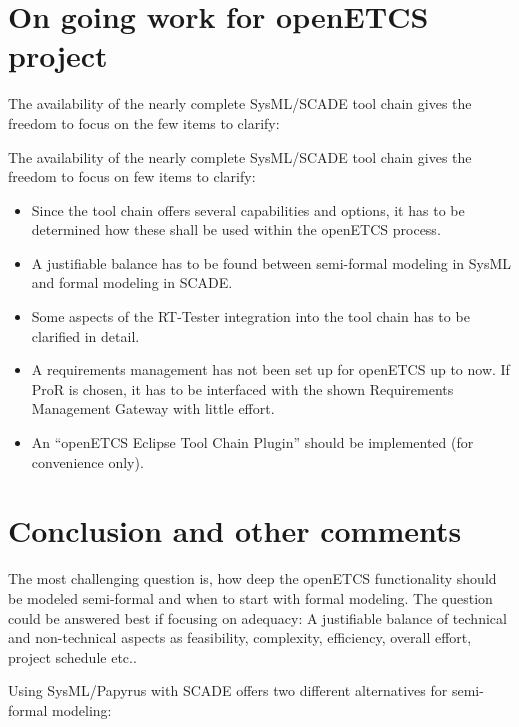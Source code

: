 \section{On going work for openETCS project}

The availability of the nearly complete SysML/SCADE tool chain gives the freedom to focus on the few items to clarify: 

The availability of the nearly complete SysML/SCADE tool chain gives the freedom to focus on few items to clarify: 

\begin{itemize}
	\item Since the tool chain offers several capabilities and options, it has to be determined how these shall be used within the openETCS process. 
	\item A justifiable balance has to be found between semi-formal modeling in SysML and formal modeling in SCADE. 
	\item Some aspects of the RT-Tester integration into the tool chain has to be clarified in detail. 
	\item A requirements management has not been set up for openETCS up to now. If ProR is chosen, it has to be interfaced with the shown Requirements Management Gateway with little effort. 
	\item An "`openETCS Eclipse Tool Chain Plugin"' should be implemented (for convenience only).  
\end{itemize}


\section{Conclusion and other comments}

The most challenging question is, how deep the openETCS functionality should be modeled semi-formal and when to start with formal modeling. 
The question could be answered best if focusing on adequacy: A justifiable balance of technical and non-technical aspects as feasibility, complexity, efficiency,  overall effort,  project schedule etc..

Using SysML/Papyrus with SCADE offers two different alternatives for semi-formal modeling:


